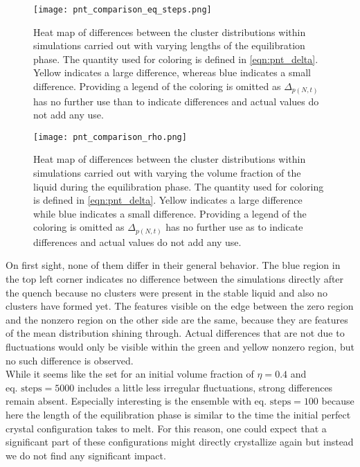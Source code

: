 \begin{figure}[h!]
\centering
\texttt{[image: pnt\_comparison\_eq\_steps.png]}
\caption[Heat maps of differences under variation of equilibration step number]{Heat map of differences between the cluster distributions within simulations carried out with varying lengths of the equilibration phase. The quantity used for coloring is defined in \autoref{eqn:pnt_delta}. Yellow indicates a large difference, whereas blue indicates a small difference. Providing a legend of the coloring is omitted as $\Delta_{p(N,t)}$ has no further use than to indicate differences and actual values do not add any use.}
\label{fig:pnt_eq_step_comparison}
\end{figure}

\begin{figure}[h!]
\centering
\texttt{[image: pnt\_comparison\_rho.png]}
\caption[Heat maps of differences under variation of initial density]{Heat map of differences between the cluster distributions within simulations carried out with varying the volume fraction of the liquid during the equilibration phase. The quantity used for coloring is defined in \autoref{eqn:pnt_delta}. Yellow indicates a large difference while blue indicates a small difference. Providing a legend of the coloring is omitted as $\Delta_{p(N,t)}$ has no further use as to indicate differences and actual values do not add any use.}
\label{fig:pnt_rho_comparison}
\end{figure}

On first sight, none of them differ in their general behavior. The blue region in the top left corner indicates no difference between the simulations directly after the quench because no clusters were present in the stable liquid and also no clusters have formed yet. The features visible on the edge between the zero region and the nonzero region on the other side are the same, because they are features of the mean distribution shining through. Actual differences that are not due to fluctuations would only be visible within the green and yellow nonzero region, but no such difference is observed.\\

While it seems like the set for an initial volume fraction of $\eta=0.4$ and $\text{eq. steps} = 5000$ includes a little less irregular fluctuations, strong differences remain absent. Especially interesting is the ensemble with $\text{eq. steps} = 100$ because here the length of the equilibration phase is similar to the time the initial perfect crystal configuration takes to melt. For this reason, one could expect that a significant part of these configurations might directly crystallize again but instead we do not find any significant impact.\\

